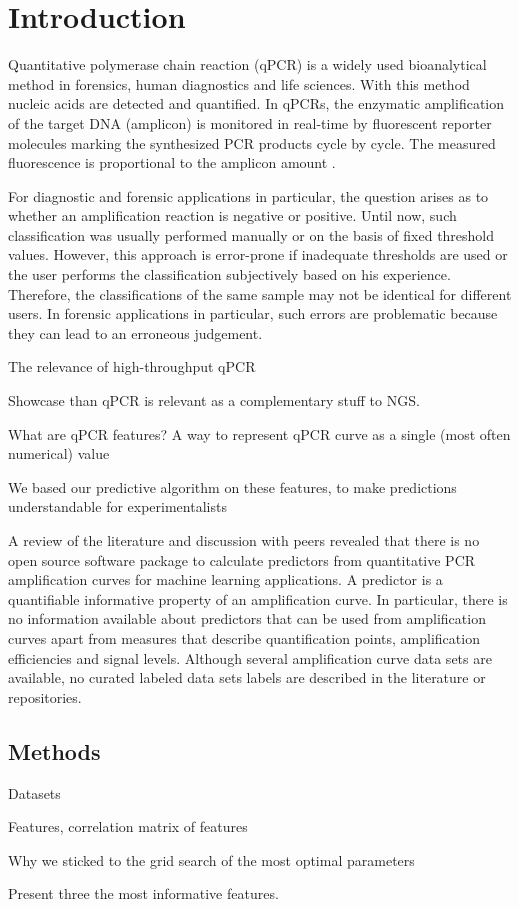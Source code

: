 \documentclass{bioinfo}
\begin{document}
\maketitle

\section{Introduction}

Quantitative polymerase chain reaction (qPCR) is a widely used bioanalytical method in forensics,
human diagnostics and life sciences. With this method nucleic acids are detected and quantified.
In qPCRs, the enzymatic amplification of the target DNA (amplicon) is monitored in real-time
by fluorescent reporter molecules marking the synthesized PCR products cycle by cycle. The
measured fluorescence is proportional to the amplicon amount \citep{pabinger_2014}.

For diagnostic and forensic applications in particular, the question arises as to whether an amplification reaction is negative or positive. Until now, such classification was usually performed manually or on the
basis of fixed threshold values. However, this approach is error-prone if inadequate thresholds are
used or the user performs the classification subjectively based on his experience. Therefore, the
classifications of the same sample may not be identical for different users. In forensic applications
in particular, such errors are problematic because they can lead to an erroneous judgement.


The relevance of high-throughput qPCR

Showcase than qPCR is relevant as a complementary stuff to NGS.

What are qPCR features? A way to represent qPCR curve as a single (most often numerical) value

We based our predictive algorithm on these features, to make predictions understandable for experimentalists

A review of the literature and discussion with peers revealed that there is no open source software
package to calculate predictors from quantitative PCR amplification curves for machine learning
applications. A predictor is a quantifiable informative property of an amplification curve. In
particular, there is no information available about predictors that can be used from amplification
curves apart from measures that describe quantification points, amplification efficiencies and
signal levels. Although several amplification curve data sets are available, no curated labeled
data sets labels are described in the literature or repositories.
\begin{methods}
\section{Methods}

Datasets

Features, correlation matrix of features

Why we sticked to the grid search of the most optimal parameters

Present three the most informative features.

\end{methods}
\end{document}
